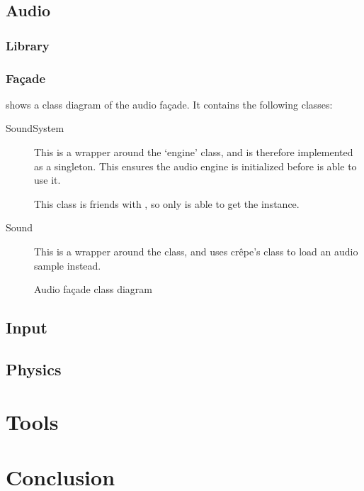 \documentclass{projdoc}
\begin{document}
\subsection{Audio}

\subsubsection{Library}

\subsubsection{Fa\c{c}ade}

 shows a class diagram of the audio fa\c{c}ade. It
contains the following classes:
\begin{description}
	\item[SoundSystem] This is a wrapper around the 
		`engine' class, and is therefore implemented as a singleton. This ensures the
		audio engine is initialized before  is able to use it.

		This class is friends with , so only  is able
		to get the  instance.
	\item[Sound] This is a wrapper around the  class, and uses
		cr\^epe's  class to load an audio sample instead.
\end{description}

\begin{figure}
	\centering
	\caption{Audio fa\c{c}ade class diagram}
	\label{fig:class-audio-facade}
\end{figure}

\subsection{Input}

\subsection{Physics}

\section{Tools}

\section{Conclusion}
\end{document}
